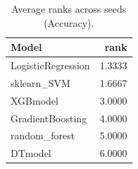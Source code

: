 \begin{table}[t]
\centering
\begin{tabular}{lr}
\toprule
Model & rank \\
\midrule
LogisticRegression & 1.3333 \\
sklearn_SVM & 1.6667 \\
XGBmodel & 3.0000 \\
GradientBoosting & 4.0000 \\
random_forest & 5.0000 \\
DTmodel & 6.0000 \\
\bottomrule
\end{tabular}
\caption{Average ranks across seeds (Accuracy).}
\label{tab:avg_rank_Accuracy}
\end{table}